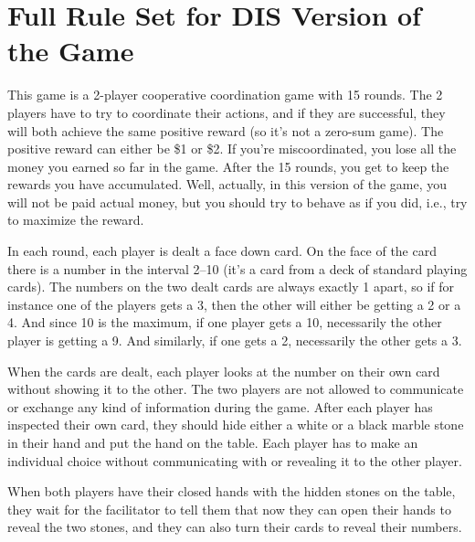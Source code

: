 \documentclass[a4paper,superscriptaddress,nofootinbib]{revtex4}
\begin{document}
\section*{Full Rule Set for DIS Version of the Game}

This game is a 2-player cooperative coordination game with 15 rounds. The 2 players have to try to coordinate their actions, and if they are successful, they will both achieve the same positive reward (so it's not a zero-sum game). The positive reward can either be \$1 or \$2. If you're miscoordinated, you lose all the money you earned so far in the game. After the 15 rounds, you get to keep the rewards you have accumulated. Well, actually, in this version of the game, you will not be paid actual money, but you should try to behave as if you did, i.e., try to maximize the reward.

  

In each round, each player is dealt a face down card. On the face of the card there is a number in the interval 2--10 (it's a card from a deck of standard playing cards). The numbers on the two dealt cards are always exactly 1 apart, so if for instance one of the players gets a 3, then the other will either be getting a 2 or a 4. And since 10 is the maximum, if one player gets a 10, necessarily the other player is getting a 9. And similarly, if one gets a 2, necessarily the other gets a 3.  

When the cards are dealt, each player looks at the number on their own card without showing it to the other. The two players are not allowed to communicate or exchange any kind of information during the game. After each player has inspected their own card, they should hide either a white or a black marble stone in their hand and put the hand on the table. Each player has to make an individual choice without communicating with or revealing it to the other player. 

When both players have their closed hands with the hidden stones on the table, they wait for the facilitator to tell them that now they can open their hands to reveal the two stones, and they can also turn their cards to reveal their numbers.  
\end{document}
